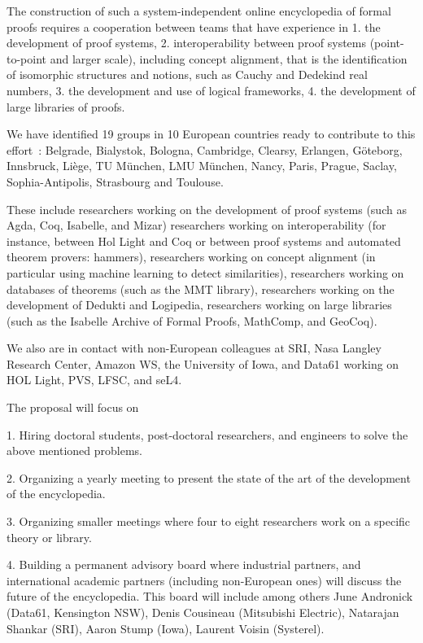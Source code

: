 The construction of such a system-independent online encyclopedia of formal proofs requires a cooperation between teams that have experience in
1. the development of proof systems,
2. interoperability between proof systems (point-to-point and larger scale), including concept alignment, that is the identification of isomorphic structures and notions, such as Cauchy and Dedekind real numbers,
3. the development and use of logical frameworks,
4. the development of large libraries of proofs.

We have identified 19 groups in 10 European countries ready to contribute to this effort : Belgrade, Bialystok, Bologna, Cambridge, Clearsy, Erlangen, G\"oteborg, Innsbruck, Liège, TU München, LMU München, Nancy, Paris, Prague, Saclay, Sophia-Antipolis, Strasbourg and Toulouse.

These include researchers working on the development of proof systems
(such as Agda, Coq, Isabelle, and Mizar) researchers working on
interoperability (for instance, between Hol Light and Coq or between
proof systems and automated theorem provers: hammers), researchers
working on concept alignment (in particular using machine learning to
detect similarities), researchers working on databases of theorems
(such as the MMT library), researchers working on the development of
Dedukti and Logipedia, researchers working on large libraries (such as
the Isabelle Archive of Formal Proofs, MathComp, and GeoCoq).


We also are in contact with non-European colleagues at SRI, Nasa
Langley Research Center, Amazon WS, the University of Iowa, and Data61
working on HOL Light, PVS, LFSC, and seL4.

The proposal will focus on

1. Hiring doctoral students, post-doctoral researchers, and engineers to solve the above mentioned problems.

2. Organizing a yearly meeting to present the state of the art of the development of the encyclopedia.

3. Organizing smaller meetings where four to eight researchers work on a specific theory or library.

4. Building a permanent advisory board where industrial partners, and
international academic partners (including non-European ones) will
discuss the future of the encyclopedia. This board will include among
others June Andronick (Data61, Kensington NSW), Denis Cousineau
(Mitsubishi Electric), Natarajan Shankar (SRI), Aaron Stump (Iowa),
Laurent Voisin (Systerel).

